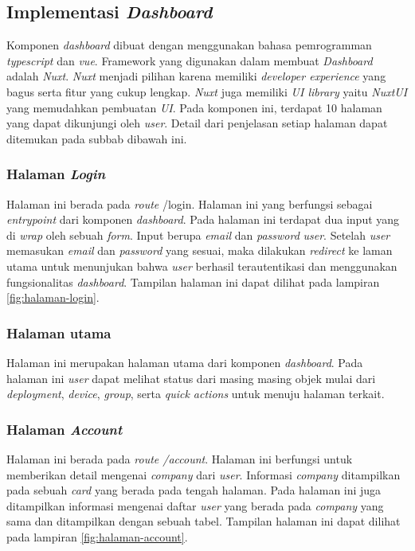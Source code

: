 \subsection{Implementasi \textit{Dashboard}}
Komponen \textit{dashboard} dibuat dengan menggunakan bahasa pemrogramman \textit{typescript} dan \textit{vue}. Framework yang digunakan dalam membuat \textit{Dashboard} adalah \textit{Nuxt}. \textit{Nuxt} menjadi pilihan karena memiliki \textit{developer experience} yang bagus serta fitur yang cukup lengkap. \textit{Nuxt} juga memiliki \textit{UI library} yaitu \textit{NuxtUI} yang memudahkan pembuatan \textit{UI}. Pada komponen ini, terdapat 10 halaman yang dapat dikunjungi oleh \textit{user}. Detail dari penjelasan setiap halaman dapat ditemukan pada subbab dibawah ini.

\subsubsection{Halaman \textit{Login}}
Halaman ini berada pada \textit{route} /login. Halaman ini yang berfungsi sebagai \textit{entrypoint} dari komponen \textit{dashboard}. Pada halaman ini terdapat dua input yang di \textit{wrap} oleh sebuah \textit{form}. Input berupa \textit{email} dan \textit{password} \textit{user}. Setelah \textit{user} memasukan \textit{email} dan \textit{password} yang sesuai, maka dilakukan \textit{redirect} ke laman utama untuk menunjukan bahwa \textit{user} berhasil terautentikasi dan menggunakan fungsionalitas \textit{dashboard}. Tampilan halaman ini dapat dilihat pada lampiran \ref{fig:halaman-login}.

\subsubsection{Halaman utama}
Halaman ini merupakan halaman utama dari komponen \textit{dashboard}. Pada halaman ini \textit{user} dapat melihat status dari masing masing objek mulai dari \textit{deployment}, \textit{device}, \textit{group}, serta \textit{quick actions} untuk menuju halaman terkait.

\subsubsection{Halaman \textit{Account}}
Halaman ini berada pada \textit{route /account}. Halaman ini berfungsi untuk memberikan detail mengenai \textit{company} dari \textit{user}. Informasi \textit{company} ditampilkan pada sebuah \textit{card} yang berada pada tengah halaman. Pada halaman ini juga ditampilkan informasi mengenai daftar \textit{user} yang berada pada \textit{company} yang sama dan ditampilkan dengan sebuah tabel. Tampilan halaman ini dapat dilihat pada lampiran \ref{fig:halaman-account}.

